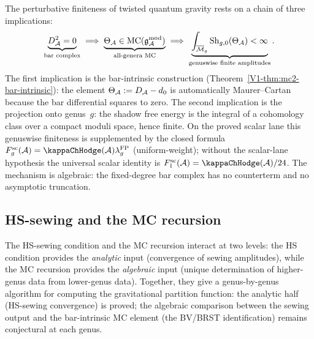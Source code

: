 \begin{remark}
The perturbative finiteness of twisted quantum gravity rests on a chain of three implications:
\begin{equation}%
\underbrace{D_\cA^2 = 0}_{\text{bar complex}} \;\Longrightarrow\; \underbrace{\Theta_\cA \in \mathrm{MC}(\gAmod)}_{\text{all-genera MC}} \;\Longrightarrow\; \underbrace{\int_{\overline{\mathcal{M}}_g}\operatorname{Sh}_{g,0}(\Theta_\cA) < \infty}_{\text{genuswise finite amplitudes}}.
\end{equation}
The first implication is the bar-intrinsic construction
\textup{(}Theorem~\ref*{V1-thm:mc2-bar-intrinsic}\textup{)}: the
element $\Theta_{\mathcal{A}} := D_{\mathcal{A}} - d_0$ is automatically Maurer--Cartan
because the bar differential squares to zero. The second implication
is the projection onto genus~$g$: the shadow free energy is the
integral of a cohomology class over a compact moduli space, hence
finite. On the proved scalar lane this genuswise finiteness is
supplemented by the closed formula
$F_g^{\mathrm{sc}}(\cA)=\kappaChHodge(\cA)\lambda_g^{\mathrm{FP}}$
\textup{(}uniform-weight\textup{)}; without the scalar-lane
hypothesis the universal scalar identity is
$F_1^{\mathrm{sc}}(\cA)=\kappaChHodge(\cA)/24$. The
mechanism is algebraic: the fixed-degree bar complex has no
counterterm and no asymptotic truncation.
\end{remark}



\subsection{HS-sewing and the MC recursion}

The HS-sewing condition and the MC recursion interact at two levels: the HS condition provides the \emph{analytic} input (convergence of sewing amplitudes), while the MC recursion provides the \emph{algebraic} input (unique determination of higher-genus data from lower-genus data). Together, they give a genus-by-genus algorithm for computing the gravitational partition function: the analytic half (HS-sewing convergence) is proved; the algebraic comparison between the sewing output and the bar-intrinsic MC element (the BV/BRST identification) remains conjectural at each genus.

